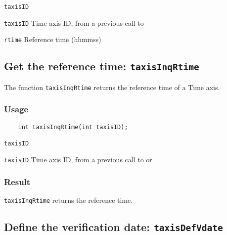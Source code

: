 \hspace*{4mm}\begin{minipage}[]{15cm}
\begin{deflist}{\texttt{taxisID}\ }
\item[\texttt{taxisID}]
Time axis ID, from a previous call to {}
\item[\texttt{rtime}]
Reference time (hhmmss)

\end{deflist}
\end{minipage}


\subsection{Get the reference time: \texttt{taxisInqRtime}}
\label{taxisInqRtime}

The function {\texttt{taxisInqRtime}} returns the reference time of a Time axis.

\subsubsection*{Usage}

\begin{verbatim}
    int taxisInqRtime(int taxisID);
\end{verbatim}

\hspace*{4mm}\begin{minipage}[]{15cm}
\begin{deflist}{\texttt{taxisID}\ }
\item[\texttt{taxisID}]
Time axis ID, from a previous call to {} or {}

\end{deflist}
\end{minipage}

\subsubsection*{Result}

{\texttt{taxisInqRtime}} returns the reference time.



\subsection{Define the verification date: \texttt{taxisDefVdate}}
\label{taxisDefVdate}

